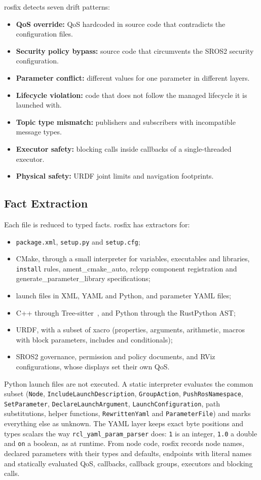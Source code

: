 \documentclass[conference]{IEEEtran}
\newcommand{\code}[1]{\texttt{#1}}
\begin{document}
rosfix detects seven drift patterns:
\begin{itemize}
\item \textbf{QoS override:} QoS hardcoded in source code that contradicts the configuration files.
\item \textbf{Security policy bypass:} source code that circumvents the SROS2 security configuration.
\item \textbf{Parameter conflict:} different values for one parameter in different layers.
\item \textbf{Lifecycle violation:} code that does not follow the managed lifecycle it is launched with.
\item \textbf{Topic type mismatch:} publishers and subscribers with incompatible message types.
\item \textbf{Executor safety:} blocking calls inside callbacks of a single-threaded executor.
\item \textbf{Physical safety:} URDF joint limits and navigation footprints.
\end{itemize}

\subsection{Fact Extraction}
\label{sec:facts}

Each file is reduced to typed facts. rosfix has extractors for:
\begin{itemize}
\item \code{package.xml}, \code{setup.py} and \code{setup.cfg};
\item CMake, through a small interpreter for variables, executables and libraries,
  \code{install} rules, ament\_cmake\_auto, rclcpp component registration and
  generate\_parameter\_library specifications;
\item launch files in XML, YAML and Python, and parameter YAML files;
\item C++ through Tree-sitter~\cite{treesitter}, and Python through the RustPython AST;
\item URDF, with a subset of xacro (properties, arguments, arithmetic, macros with block
  parameters, includes and conditionals);
\item SROS2 governance, permission and policy documents, and RViz configurations, whose
  displays set their own QoS.
\end{itemize}

Python launch files are not executed. A static interpreter evaluates the common subset
(\code{Node}, \code{IncludeLaunchDescription}, \code{GroupAction}, \code{PushRosNamespace},
\code{SetParameter}, \code{DeclareLaunchArgument}, \code{LaunchConfiguration}, path
substitutions, helper functions, \code{RewrittenYaml} and \code{ParameterFile}) and marks
everything else as unknown. The YAML layer keeps exact byte positions and types scalars the way
\code{rcl\_yaml\_param\_parser} does: \code{1} is an integer, \code{1.0} a double and \code{on}
a boolean, as at runtime. From node code, rosfix records node names, declared parameters with
their types and defaults, endpoints with literal names and statically evaluated QoS, callbacks,
callback groups, executors and blocking calls.
\end{document}
